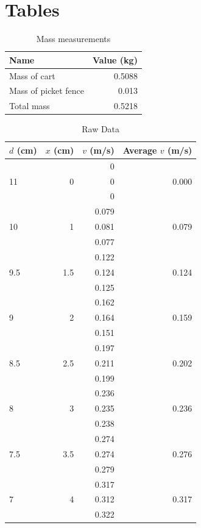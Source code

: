 \section{Tables}
\begin{table}
    \centering
    \begin{tabular}{|l|r|}
        \hline
        Name & Value (kg) \\
        \hline
        Mass of cart & 0.5088 \\
        Mass of picket fence & 0.013 \\
        Total mass & 0.5218 \\
        \hline
    \end{tabular}
    \caption{Mass measurements}
    \label{table:06.mass}
\end{table}
\begin{table}
    \centering
    \begin{tabular}{|l|r|r|r|}
        \hline
        $d$ (cm) & $x$ (cm) & $v$ (m/s) & Average $v$ (m/s) \\
        \hline
         & & 0 & \\
        11 & 0 & 0 & 0.000 \\
         & & 0 & \\
        \hline
         & & 0.079 & \\
        10 & 1 & 0.081 & 0.079 \\
         & & 0.077 & \\
        \hline
         & & 0.122 & \\
        9.5 & 1.5 & 0.124 & 0.124 \\
         & & 0.125 & \\
        \hline
         & & 0.162 & \\
        9 & 2 & 0.164 & 0.159 \\
         & & 0.151 & \\
        \hline
         & & 0.197 & \\
        8.5 & 2.5 & 0.211 & 0.202 \\
         & & 0.199 & \\
        \hline
         & & 0.236 & \\
        8 & 3 & 0.235 & 0.236 \\
         & & 0.238 & \\
        \hline
         & & 0.274 & \\
        7.5 & 3.5 & 0.274 & 0.276 \\
         & & 0.279 & \\
        \hline
         & & 0.317 & \\
        7 & 4 & 0.312 & 0.317 \\
         & & 0.322 & \\
        \hline
    \end{tabular}
    \caption{Raw Data}
    \label{table:06.data}
\end{table}
\FloatBarrier
\newpage

